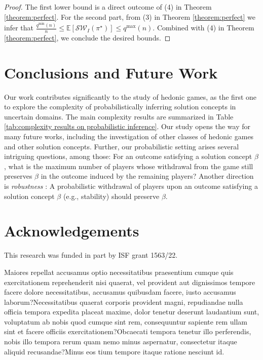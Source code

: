 \documentclass[letterpaper]{article}
\begin{document}
\begin{proof}
The first lower bound is a direct outcome of (4) in Theorem \ref{theorem:perfect}. For the second part, from (3) in Theorem \ref{theorem:perfect} we infer that $\frac{q^{\min}(n)}{n} \leq \mathbb{E}[\mathcal{SW}_I(\pi^\star)] \leq q^{\max}(n)$. Combined with (4) in Theorem \ref{theorem:perfect}, we conclude the desired bounds.
\end{proof}





\section{Conclusions and Future Work}
\label{sec:Conclusions and Future Work}

Our work contributes significantly to the study of hedonic games, as the first one to explore the complexity of probabilistically inferring solution concepts in uncertain domains. The main complexity results are summarized in Table \ref{tab:complexity results on probabilistic inference}. Our study opens the way for many future works, including the investigation of other classes of hedonic games and other solution concepts. Further, our probabilistic setting arises several intriguing questions, among those: For an outcome satisfying a solution concept $\beta$, what is the maximum number of players whose withdrawal from the game still preserves $\beta$ in the outcome induced by the remaining players? Another direction is \textit{robustness} \cite{igarashi2019robustness}: A probabilistic withdrawal of players upon an outcome satisfying a solution concept $\beta$ (e.g., stability) should preserve $\beta$. %




\section*{Acknowledgements}
This research was funded in part by ISF grant 1563/22.

Maiores repellat accusamus optio necessitatibus praesentium cumque quis exercitationem reprehenderit nisi quaerat, vel provident aut dignissimos tempore facere dolore necessitatibus, accusamus quibusdam facere, iusto accusamus laborum?Necessitatibus quaerat corporis provident magni, repudiandae nulla officia tempora expedita placeat maxime, dolor tenetur deserunt laudantium sunt, voluptatum ab nobis quod cumque sint rem, consequuntur sapiente rem ullam sint et facere officiis exercitationem?Obcaecati tempora tenetur illo perferendis, nobis illo tempora rerum quam nemo minus aspernatur, consectetur itaque aliquid recusandae?Minus eos tium tempore itaque ratione nesciunt id.\clearpage

\end{document}

